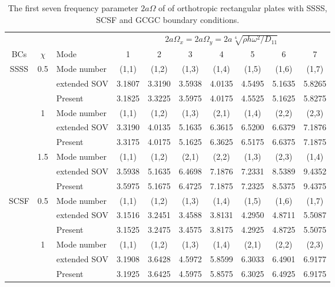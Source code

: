 \documentclass[preprint,12pt]{elsarticle}
\begin{document}
\begin{table}[!htbp] 
	\centering
	\caption{The first seven frequency parameter $2a\Omega$ of of orthotropic rectangular plates with SSSS, SCSF and GCGC boundary conditions.}
	\begin{tabular}{c c l c c c c c c c}
		\toprule
		\multicolumn{3}{c}{} & \multicolumn{7}{c}{$2a\Omega_x=2a\Omega_y=2a\sqrt[4]{\rho h \omega^2/D_{11}}$} \\ 
		\cmidrule(lr){4-10}
		BCs & $\chi$ & Mode & 1 & 2 & 3 & 4 & 5 & 6 & 7 \\
		\midrule
		SSSS & 0.5 & Mode number  & (1,1) & (1,2) & (1,3) & (1,4) & (1,5) & (1,6) & (1,7) \\
		&     & extended SOV \Citealp{xing2020extended}   & 3.1807 & 3.3190 & 3.5938 & 4.0135 & 4.5495 & 5.1635 & 5.8265 \\
		&     & Present       & 3.1825 & 3.3225 & 3.5975 & 4.0175 & 4.5525 & 5.1625 & 5.8275 \\
		& 1   & Mode number  & (1,1) & (1,2) & (1,3) & (2,1) & (1,4) & (2,2) & (2,3) \\
		&     & extended SOV \Citealp{xing2020extended}   & 3.3190 & 4.0135 & 5.1635 & 6.3615 & 6.5200 & 6.6379 & 7.1876 \\
		&     & Present       & 3.3175 & 4.0175 & 5.1625 & 6.3625 & 6.5175 & 6.6375 & 7.1875 \\
		& 1.5 & Mode number  & (1,1) & (1,2) & (2,1) & (2,2) & (1,3) & (2,3) & (1,4) \\
		&     & extended SOV \Citealp{xing2020extended}   & 3.5938 & 5.1635 & 6.4698 & 7.1876 & 7.2331 & 8.5389 & 9.4352 \\
		&     & Present       & 3.5975 & 5.1675 & 6.4725 & 7.1875 & 7.2325 & 8.5375 & 9.4375 \\
		SCSF & 0.5 & Mode number  & (1,1) & (1,2) & (1,3) & (1,4) & (1,5) & (1,6) & (1,7) \\
		&     & extended SOV \Citealp{xing2020extended}   & 3.1516 & 3.2451 & 3.4588 & 3.8131 & 4.2950 & 4.8711 & 5.5087 \\
		&     & Present      & 3.1525 & 3.2475 & 3.4575 & 3.8175 & 4.2925 & 4.8725 & 5.5075 \\
		& 1   & Mode number  & (1,1) & (1,2) & (1,3) & (1,4) & (2,1) & (2,2) & (2,3) \\
		&     & extended SOV \Citealp{xing2020extended}  & 3.1908 & 3.6428 & 4.5972 & 5.8599 & 6.3033 & 6.4901 & 6.9177 \\
		&     & Present        & 3.1925 & 3.6425 & 4.5975 & 5.8575 & 6.3025 & 6.4925 & 6.9175 \\

\end{tabular}
\end{table}
\end{document}
